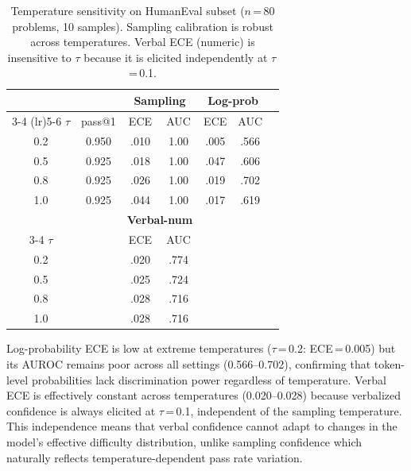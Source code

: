 \documentclass{article}
\begin{document}
\begin{table}[t]
\centering
\caption{Temperature sensitivity on HumanEval subset ($n$\,=\,80 problems, 10 samples). Sampling calibration is robust across temperatures. Verbal ECE (numeric) is insensitive to $\tau$ because it is elicited independently at $\tau$\,=\,0.1.}
\label{tab:temperature}
\small
\setlength{\tabcolsep}{2.5pt}
\begin{tabular}{@{}ccccccc@{}}
\toprule
& & \multicolumn{2}{c}{\textbf{Sampling}} & \multicolumn{2}{c}{\textbf{Log-prob}} \\
\cmidrule(lr){3-4} \cmidrule(lr){5-6}
$\tau$ & pass@1 & ECE & AUC & ECE & AUC \\
\midrule
0.2 & 0.950 & .010 & 1.00 & .005 & .566 \\
0.5 & 0.925 & .018 & 1.00 & .047 & .606 \\
0.8 & 0.925 & .026 & 1.00 & .019 & .702 \\
1.0 & 0.925 & .044 & 1.00 & .017 & .619 \\
\midrule
& & \multicolumn{2}{c}{\textbf{Verbal-num}} \\
\cmidrule(lr){3-4}
$\tau$ & & ECE & AUC \\
\midrule
0.2 & & .020 & .774 \\
0.5 & & .025 & .724 \\
0.8 & & .028 & .716 \\
1.0 & & .028 & .716 \\
\bottomrule
\end{tabular}
\vspace{-0.5em}
\end{table}

Log-probability ECE is low at extreme temperatures ($\tau$\,=\,0.2: ECE\,=\,0.005) but its AUROC remains poor across all settings (0.566--0.702), confirming that token-level probabilities lack discrimination power regardless of temperature. Verbal ECE is effectively constant across temperatures (0.020--0.028) because verbalized confidence is always elicited at $\tau$\,=\,0.1, independent of the sampling temperature. This independence means that verbal confidence cannot adapt to changes in the model's effective difficulty distribution, unlike sampling confidence which naturally reflects temperature-dependent pass rate variation.
\end{document}
